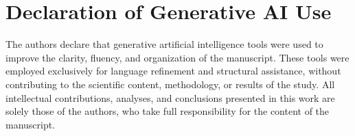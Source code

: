 \documentclass[a4paper,fleqn]{cas-sc}
\begin{document}



\section*{Declaration of Generative AI Use}

The authors declare that generative artificial intelligence tools 
were used to improve the clarity, fluency, and organization of the manuscript. 
These tools were employed exclusively for language refinement and 
structural assistance, without contributing to the scientific content, 
methodology, or results of the study. 
All intellectual contributions, analyses, and conclusions presented 
in this work are solely those of the authors, who take full 
responsibility for the content of the manuscript.

%





\end{document}

